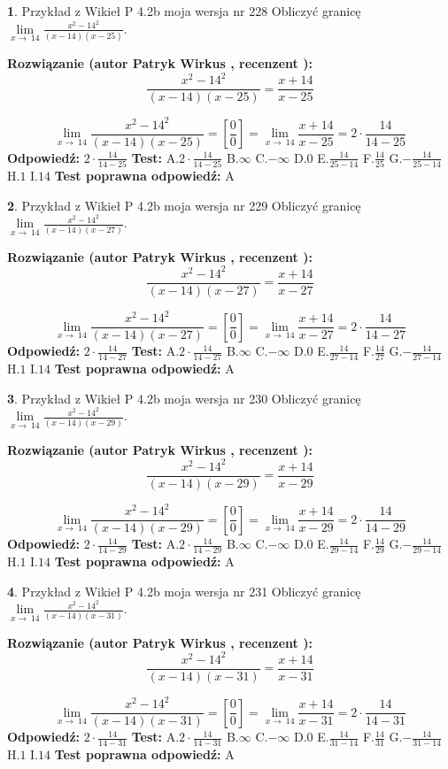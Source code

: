 \documentclass[12pt, a4paper]{article}
\theoremstyle{definition} %
\newtheorem{zad}{}
\newcommand{\zadStart}[1]{\begin{zad}#1\newline}
\newcommand{\zadStop}{\end{zad}}
\newcommand{\rozwStart}[2]{\noindent \textbf{Rozwiązanie (autor #1 , recenzent #2): }\newline}
\newcommand{\rozwStop}{\newline}
\newcommand{\odpStart}{\noindent \textbf{Odpowiedź:}\newline}
\newcommand{\odpStop}{\newline}
\newcommand{\testStart}{\noindent \textbf{Test:}\newline}
\newcommand{\testStop}{\newline}
\newcommand{\kluczStart}{\noindent \textbf{Test poprawna odpowiedź:}\newline}
\newcommand{\kluczStop}{\newline}
\begin{document}
\zadStart{Przykład z Wikieł P 4.2b moja wersja nr 228}
Obliczyć granicę $\lim\limits_{x\to\ 14}\frac{x^{2}-14^{2}}{(x-14)(x-25)}$.
\zadStop
\rozwStart{Patryk Wirkus}{}
$$\frac{x^{2}-14^{2}}{(x-14)(x-25)}=\frac{x+14}{x-25}$$

$$\lim\limits_{x\to\ 14}\frac{x^{2}-14^{2}}{(x-14)(x-25)}=[\frac{0}{0}]=\lim\limits_{x\to\ 14}\frac{x+14}{x-25}=2 \cdot \frac{14}{14-25}$$
\rozwStop
\odpStart
$2 \cdot \frac{14}{14-25}$
\odpStop
\testStart
A.$2 \cdot \frac{14}{14-25}$
B.$\infty$
C.$-\infty$
D.$0$
E.$\frac{14}{25-14}$
F.$\frac{14}{25}$
G.$-\frac{14}{25-14}$
H.$1$
I.$14$
\testStop
\kluczStart
A
\kluczStop



\zadStart{Przykład z Wikieł P 4.2b moja wersja nr 229}
Obliczyć granicę $\lim\limits_{x\to\ 14}\frac{x^{2}-14^{2}}{(x-14)(x-27)}$.
\zadStop
\rozwStart{Patryk Wirkus}{}
$$\frac{x^{2}-14^{2}}{(x-14)(x-27)}=\frac{x+14}{x-27}$$

$$\lim\limits_{x\to\ 14}\frac{x^{2}-14^{2}}{(x-14)(x-27)}=[\frac{0}{0}]=\lim\limits_{x\to\ 14}\frac{x+14}{x-27}=2 \cdot \frac{14}{14-27}$$
\rozwStop
\odpStart
$2 \cdot \frac{14}{14-27}$
\odpStop
\testStart
A.$2 \cdot \frac{14}{14-27}$
B.$\infty$
C.$-\infty$
D.$0$
E.$\frac{14}{27-14}$
F.$\frac{14}{27}$
G.$-\frac{14}{27-14}$
H.$1$
I.$14$
\testStop
\kluczStart
A
\kluczStop



\zadStart{Przykład z Wikieł P 4.2b moja wersja nr 230}
Obliczyć granicę $\lim\limits_{x\to\ 14}\frac{x^{2}-14^{2}}{(x-14)(x-29)}$.
\zadStop
\rozwStart{Patryk Wirkus}{}
$$\frac{x^{2}-14^{2}}{(x-14)(x-29)}=\frac{x+14}{x-29}$$

$$\lim\limits_{x\to\ 14}\frac{x^{2}-14^{2}}{(x-14)(x-29)}=[\frac{0}{0}]=\lim\limits_{x\to\ 14}\frac{x+14}{x-29}=2 \cdot \frac{14}{14-29}$$
\rozwStop
\odpStart
$2 \cdot \frac{14}{14-29}$
\odpStop
\testStart
A.$2 \cdot \frac{14}{14-29}$
B.$\infty$
C.$-\infty$
D.$0$
E.$\frac{14}{29-14}$
F.$\frac{14}{29}$
G.$-\frac{14}{29-14}$
H.$1$
I.$14$
\testStop
\kluczStart
A
\kluczStop



\zadStart{Przykład z Wikieł P 4.2b moja wersja nr 231}
Obliczyć granicę $\lim\limits_{x\to\ 14}\frac{x^{2}-14^{2}}{(x-14)(x-31)}$.
\zadStop
\rozwStart{Patryk Wirkus}{}
$$\frac{x^{2}-14^{2}}{(x-14)(x-31)}=\frac{x+14}{x-31}$$

$$\lim\limits_{x\to\ 14}\frac{x^{2}-14^{2}}{(x-14)(x-31)}=[\frac{0}{0}]=\lim\limits_{x\to\ 14}\frac{x+14}{x-31}=2 \cdot \frac{14}{14-31}$$
\rozwStop
\odpStart
$2 \cdot \frac{14}{14-31}$
\odpStop
\testStart
A.$2 \cdot \frac{14}{14-31}$
B.$\infty$
C.$-\infty$
D.$0$
E.$\frac{14}{31-14}$
F.$\frac{14}{31}$
G.$-\frac{14}{31-14}$
H.$1$
I.$14$
\testStop
\kluczStart
A
\kluczStop
\end{document}
